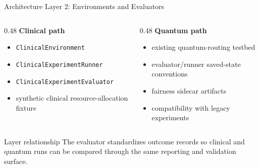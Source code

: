 \documentclass[aspectratio=169,10pt]{beamer}
\begin{document}
\begin{frame}{Architecture Layer 2: Environments and Evaluators}
\begin{columns}[T]
\begin{column}{0.48\textwidth}
\textbf{Clinical path}
\begin{itemize}
    \item \texttt{ClinicalEnvironment}
    \item \texttt{ClinicalExperimentRunner}
    \item \texttt{ClinicalExperimentEvaluator}
    \item synthetic clinical resource-allocation fixture
\end{itemize}
\end{column}
\begin{column}{0.48\textwidth}
\textbf{Quantum path}
\begin{itemize}
    \item existing quantum-routing testbed
    \item evaluator/runner saved-state conventions
    \item fairness sidecar artifacts
    \item compatibility with legacy experiments
\end{itemize}
\end{column}
\end{columns}

\vspace{0.6em}
\begin{block}{Layer relationship}
The evaluator standardizes outcome records so clinical and quantum runs can be compared through the same reporting and validation surface.
\end{block}
\end{frame}
\end{document}
